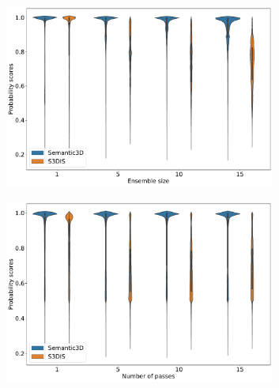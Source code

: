     \begin{figure}[h!]
        \centering
        \begin{subfigure}{0.98\textwidth}
            \includegraphics[width=0.98\textwidth, height=0.48\textheight]{images/violin_in_Probability_DE_plot.pdf}
        \end{subfigure}
        \begin{subfigure}{0.98\textwidth}
            \includegraphics[width=0.98\textwidth, height=0.48\textheight]{images/violin_in_Probability_FOUT_plot.pdf}
        \end{subfigure}
    \end{figure}
